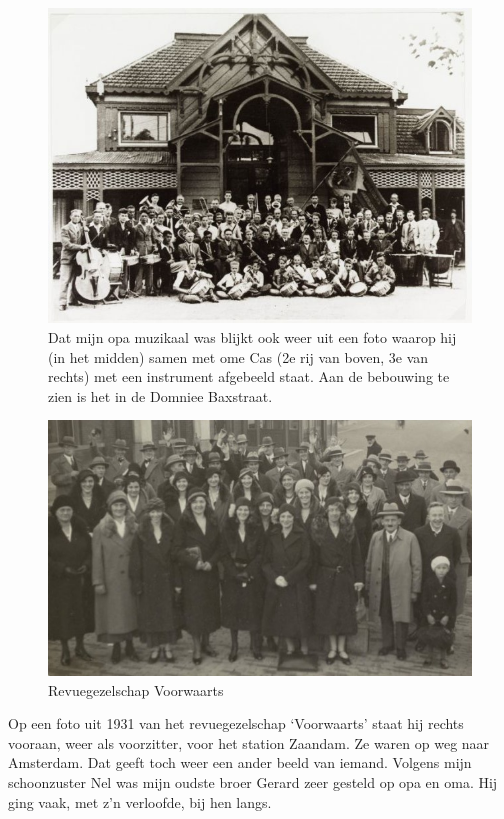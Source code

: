 \documentclass[10pt,twoside, openright]{memoir}
\begin{document}
\begin{figure}
\includegraphics[width=\textwidth]{img/ch2/ch2-afb05}
\caption*{\footnotesize Dat mijn opa muzikaal was blijkt ook weer uit een foto waarop hij (in het midden) samen met ome Cas (2e rij van boven, 3e van rechts) met een instrument afgebeeld staat. Aan de bebouwing te zien is het in de Domniee Baxstraat.}
\end{figure}

\begin{figure}
\includegraphics[width=\textwidth]{img/ch2/ch2-afb08}
\caption*{\footnotesize Revuegezelschap Voorwaarts}
\end{figure}

Op een foto uit 1931 van het revuegezelschap `Voorwaarts' staat hij rechts vooraan, weer als voorzitter, voor het station Zaandam. Ze waren op weg naar Amsterdam. Dat geeft toch weer een ander beeld van iemand. Volgens mijn schoonzuster Nel was mijn oudste broer Gerard zeer gesteld op opa en oma. Hij ging vaak, met z’n verloofde, bij hen langs. 
\end{document}
